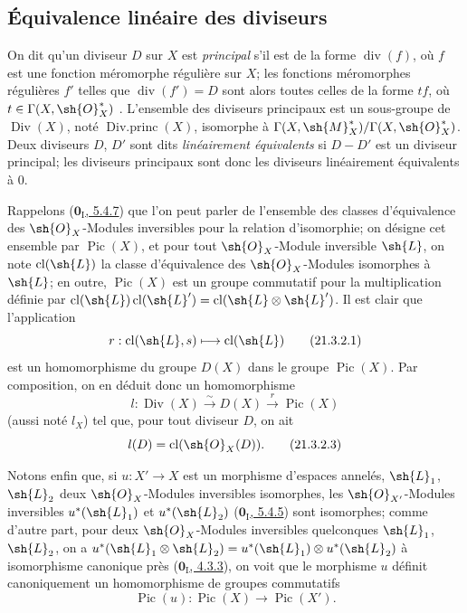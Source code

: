 
\subsection{Équivalence linéaire des diviseurs}

\begin{env}[21.3.1]
On dit qu'un diviseur $D$ sur $X$ est \emph{principal} s'il est de la forme $\operatorname{div}(f)$, où $f$ est une fonction méromorphe régulière sur $X$;
les fonctions méromorphes régulières $f'$ telles que $\operatorname{div}(f')=D$ sont alors toutes celles de la forme $tf$, où $t\in\Gamma(X,\sh{O}_X^*)$ .
L'ensemble des diviseurs principaux est un sous-groupe de $\operatorname{Div}(X)$, noté $\operatorname{Div.princ}(X)$, isomorphe à $\Gamma(X,\sh{M}_X^*)/\Gamma(X,\sh{O}_X^*)$.
Deux diviseurs $D$, $D'$ sont dits \emph{linéairement équivalents} si $D-D'$ est un diviseur principal;
les diviseurs principaux sont donc les diviseurs linéairement équivalents à $0$.
\end{env}

\begin{env}[21.3.2]
\label{IV.21.3.2}
Rappelons (\hyperref[0.5.4.7]{$\mathbf{0}_{\mathrm I}$, 5.4.7}) que l'on peut parler de l'ensemble des classes d'équivalence des $\sh{O}_X$-Modules inversibles pour la relation d'isomorphie;
on désigne cet ensemble par $\operatorname{Pic}(X)$, et pour tout $\sh{O}_X$-Module inversible $\sh{L}$, on note $\operatorname{cl}(\sh{L})$ la classe d'équivalence des $\sh{O}_X$-Modules isomorphes à $\sh{L}$;
en outre, $\operatorname{Pic}(X)$ est un groupe commutatif pour la multiplication définie par $\operatorname{cl}(\sh{L})\operatorname{cl}(\sh{L}')=\operatorname{cl}(\sh{L}\otimes\sh{L}')$.
Il est clair que l'application
\[
\label{IV.21.3.2.1}
  r:\operatorname{cl}(\sh{L},s)\mapsto\operatorname{cl}(\sh{L})
  \tag{21.3.2.1}
\]
est un homomorphisme du groupe $D(X)$  dans le groupe $\operatorname{Pic}(X)$.
Par composition, on en déduit donc un homomorphisme
\[
\label{IV.21.3.2.2}
  l:\operatorname{Div}(X)\xrightarrow{\sim}D(X)\xrightarrow{r}\operatorname{Pic}(X)
  \tag{21.3.2.2}
\]
(aussi noté $l_X$) tel que, pour tout diviseur $D$, on ait
\[
\label{IV.21.3.2.3}
  l(D)=\operatorname{cl}(\sh{O}_X(D)).
  \tag{21.3.2.3}
\]

Notons enfin que, si $u:X'\to X$ est un morphisme d'espaces annelés, $\sh{L}_1$, $\sh{L}_2$ deux $\sh{O}_X$-Modules inversibles isomorphes, les $\sh{O}_{X'}$-Modules inversibles $u^*(\sh{L}_1)$ et $u^*(\sh{L}_2)$ (\hyperref[0.5.4.5]{$\mathbf{0}_{\mathrm I}$, 5.4.5}) sont isomorphes;
comme d'autre part, pour deux $\sh{O}_X$-Modules inversibles quelconques $\sh{L}_1$, $\sh{L}_2$, on a $u^*(\sh{L}_1\otimes\sh{L}_2)=u^*(\sh{L}_1)\otimes u^*(\sh{L}_2)$ à isomorphisme canonique près (\hyperref[0.4.3.3]{$\mathbf{0}_{\mathrm I}$, 4.3.3}), on voit que le morphisme $u$ définit canoniquement un homomorphisme de groupes commutatifs
\[
\label{IV.21.3.2.4}
  \operatorname{Pic}(u):\operatorname{Pic}(X)\to\operatorname{Pic}(X').
  \tag{21.3.2.4}
\]
\end{env}


